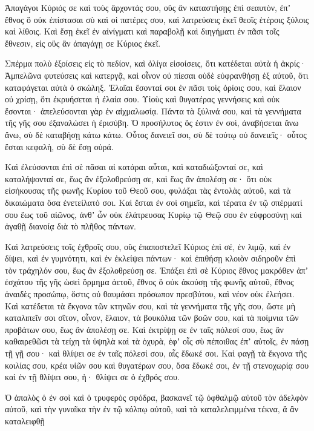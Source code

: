 {\par }{\PP {}Ἀπαγάγοι Κύριός σε καὶ τοὺς ἄρχοντάς σου, οὓς ἂν καταστήσῃς ἐπὶ σεαυτὸν, ἐπʼ ἔθνος ὃ οὐκ ἐπίστασαι σὺ καὶ οἱ πατέρες σου, καὶ λατρεύσεις ἐκεῖ θεοῖς ἑτέροις ξύλοις καὶ λίθοις.
Καὶ ἔσῃ ἐκεῖ ἐν αἰνίγματι καὶ παραβολῇ καὶ διηγήματι ἐν πᾶσι τοῖς ἔθνεσιν, εἰς οὓς ἂν ἀπαγάγῃ σε Κύριος ἐκεῖ.
\par }{\PP {}Σπέρμα πολὺ ἐξοίσεις εἰς τὸ πεδίον, καὶ ὀλίγα εἰσοίσεις, ὅτι κατέδεται αὐτὰ ἡ ἀκρίς·
Ἀμπελῶνα φυτεύσεις καὶ κατεργᾷ, καὶ οἶνον οὐ πίεσαι οὐδὲ εὐφρανθήσῃ ἐξ αὐτοῦ, ὅτι καταφάγεται αὐτὰ ὁ σκώληξ.
Ἐλαῖαι ἔσονταί σοι ἐν πᾶσι τοὶς ὁρίοις σου, καὶ ἔλαιον οὐ χρίσῃ, ὅτι ἐκρυήσεται ἡ ἐλαία σου.
Υἱοὺς καὶ θυγατέρας γεννήσεις καὶ οὐκ ἔσονται· ἀπελεύσονται γὰρ ἐν αἰχμαλωσίᾳ.
Πάντα τὰ ξύλινά σου, καὶ τὰ γεννήματα τῆς γῆς σου ἐξαναλώσει ἡ ἐρισύβη.
Ὁ προσήλυτος ὅς ἐστιν ἐν σοὶ, ἀναβήσεται ἄνω ἄνω, σὺ δὲ καταβήσῃ κάτω κάτω.
Οὗτος δανειεῖ σοι, σὺ δὲ τούτῳ οὐ δανειεῖς· οὗτος ἔσται κεφαλὴ, σὺ δὲ ἔσῃ οὐρά.
\par }{\PP {}Καὶ ἐλεύσονται ἐπὶ σὲ πᾶσαι αἱ κατάραι αὗται, καὶ καταδιώξονταί σε, καὶ καταλήψονταί σε, ἔως ἂν ἐξολοθρεύσῃ σε, καὶ ἕως ἂν ἀπολέσῃ σε· ὅτι οὐκ εἰσήκουσας τῆς φωνῆς Κυρίου τοῦ Θεοῦ σου, φυλάξαι τὰς ἐντολὰς αὐτοῦ, καὶ τὰ δικαιώματα ὅσα ἐνετείλατό σοι.
Καὶ ἔσται ἐν σοὶ σημεῖα, καὶ τέρατα ἐν τῷ σπέρματί σου ἕως τοῦ αἰῶνος,
ἀνθʼ ὧν οὐκ ἐλάτρευσας Κυρίῳ τῷ Θεῷ σου ἐν εὐφροσύνῃ καὶ ἀγαθῇ διανοίᾳ διὰ τὸ πλῆθος πάντων.
\par }{\PP {}Καὶ λατρεύσεις τοῖς ἐχθροῖς σου, οὓς ἐπαποστελεῖ Κύριος ἐπὶ σέ, ἐν λιμῷ, καὶ ἐν δίψει, καὶ ἐν γυμνότητι, καὶ ἐν ἐκλείψει πάντων· καὶ ἐπιθήσῃ κλοιὸν σιδηροῦν ἐπὶ τὸν τράχηλόν σου, ἕως ἂν ἐξολοθρεύσῃ σε.
Ἐπάξει ἐπὶ σὲ Κύριος ἔθνος μακρόθεν ἀπʼ ἐσχάτου τῆς γῆς ὡσεὶ ὅρμημα ἀετοῦ, ἔθνος ὃ οὐκ ἀκούσῃ τῆς φωνῆς αὐτοῦ,
ἔθνος ἀναιδὲς προσώπῳ, ὅστις οὐ θαυμάσει πρόσωπον πρεσβύτου, καὶ νέον οὐκ ἐλεήσει.
Καὶ κατέδεται τὰ ἔκγονα τῶν κτηνῶν σου, καὶ τὰ γεννήματα τῆς γῆς σου, ὥστε μὴ καταλιπεῖν σοι σῖτον, οἶνον, ἔλαιον, τὰ βουκόλια τῶν βοῶν σου, καὶ τὰ ποίμνια τῶν προβάτων σου, ἕως ἂν ἀπολέσῃ σε.
Καὶ ἐκτρίψῃ σε ἐν ταῖς πόλεσί σου, ἕως ἂν καθαιρεθῶσι τὰ τείχη τὰ ὑψηλὰ καὶ τὰ ὀχυρὰ, ἐφʼ οἷς σὺ πέποιθας ἐπʼ αὐτοῖς, ἐν πάσῃ τῇ γῇ σου· καὶ θλίψει σε ἐν ταῖς πόλεσί σου, αἷς ἔδωκέ σοι.
Καὶ φαγῇ τὰ ἔκγονα τῆς κοιλίας σου, κρέα υἱῶν σου καὶ θυγατέρων σου, ὅσα ἔδωκέ σοι, ἐν τῇ στενοχωρίᾳ σου καὶ ἐν τῇ θλίψει σου, ἡ· θλίψει σε ὁ ἐχθρός σου.
\par }{\PP {}Ὁ ἁπαλὸς ὁ ἐν σοὶ καὶ ὁ τρυφερὸς σφόδρα, βασκανεῖ τῷ ὀφθαλμῷ αὐτοῦ τὸν ἀδελφὸν αὐτοῦ, καὶ τὴν γυναῖκα τὴν ἐν τῷ κόλπῳ αὐτοῦ, καὶ τὰ καταλελειμμένα τέκνα, ἃ ἂν καταλειφθῇ
}
